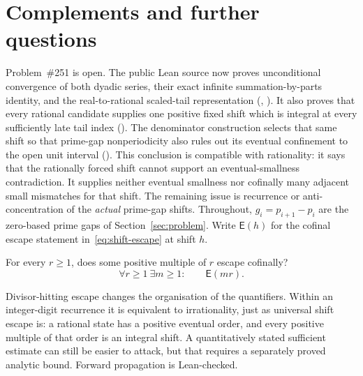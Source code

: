 \documentclass[11pt]{article}
\begin{document}
\section{Complements and further questions}\label{sec:open}

Problem~\#251 is open.  The public Lean source now proves unconditional
convergence of both dyadic series, their exact infinite summation-by-parts
identity, and the real-to-rational scaled-tail representation
(,
).
It also proves that every rational candidate supplies one positive fixed shift
which is integral at every sufficiently late tail index
().
The denominator construction selects that same shift so that prime-gap
nonperiodicity also rules out its eventual confinement to the open unit
interval
().
This conclusion is compatible with rationality: it says that the rationally
forced shift cannot support an eventual-smallness contradiction.  It supplies
neither eventual smallness nor cofinally many adjacent small mismatches for
that shift.
The remaining issue is recurrence or anti-concentration of the \emph{actual}
prime-gap shifts.  Throughout, $g_i=p_{i+1}-p_i$ are the zero-based prime gaps
of Section~\ref{sec:problem}.  Write $\mathsf E(h)$ for the cofinal escape
statement in~\eqref{eq:shift-escape} at shift $h$.

\begin{problem}\label{prob:divisor-hit}
For every $r\ge1$, does some positive multiple of $r$ escape cofinally?
\[
  \forall r\ge1\ \exists m\ge1:\qquad \mathsf E(mr).
\]
\end{problem}

\noindent Divisor-hitting escape changes the organisation of the
quantifiers.  Within an integer-digit recurrence it is equivalent to
irrationality, just as universal shift escape is: a rational state has a
positive eventual order, and every positive multiple of that order is an
integral shift.  A quantitatively stated sufficient estimate can still be
easier to attack, but that requires a separately proved analytic bound.
Forward propagation is Lean-checked.
\end{document}
